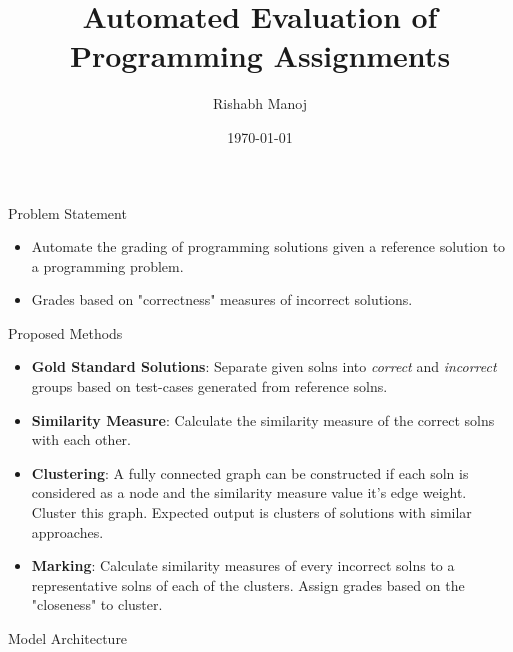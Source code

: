 \documentclass{beamer}
\title{Automated Evaluation of Programming Assignments}
\author{Rishabh Manoj}
\institute{International Institute of Information Technology - Bangalore}
\date{\today}
\begin{document}
\begin{frame}
  \titlepage
\end{frame}




\begin{frame}{Problem Statement}{}
    \begin{itemize}
        \item Automate the grading of programming solutions given a reference solution to a programming problem.\\
        \item Grades based on "correctness" measures of incorrect solutions.
    \end{itemize}
    
    
\end{frame}

\begin{frame}{Proposed Methods}{}
  \begin{itemize}
      \item \textbf{Gold Standard Solutions}: Separate given solns into \textit{correct} and \textit{incorrect} groups based on test-cases generated from reference solns. 
      \item \textbf{Similarity Measure}: Calculate the similarity measure of the correct solns with each other.
      \item \textbf{Clustering}: A fully connected graph can be constructed if each soln is considered as a node and the similarity measure value it's edge weight. Cluster this graph. Expected output is clusters of solutions with similar approaches.
      \item \textbf{Marking}: Calculate similarity measures of every incorrect solns to a representative solns of each of the clusters. Assign grades based on the "closeness" to cluster.  
  \end{itemize}
  
\end{frame}

\begin{frame}{Model Architecture}

\begin{center}


\end{center}

\end{frame}
\end{document}
